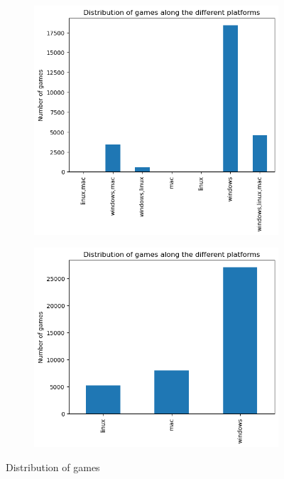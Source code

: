 \documentclass[11pt]{article}
\begin{document}
\begin{figure}[h]
    \centering
    \begin{subfigure}[b]{0.45\columnwidth}
        \centering
        \includegraphics[width=\textwidth]{graphics/insight3_graph1.png}
        \label{fig:insight3_1}
    \end{subfigure}
    \begin{subfigure}[b]{0.45\columnwidth}
        \centering
        \includegraphics[width=\textwidth]{graphics/insight3_graph2.png}
        \label{fig:insight3_2}
    \end{subfigure}
    
    \caption{Distribution of games}
    \label{fig:insight3_distro_plat} 
  \end{figure}
\end{document}
